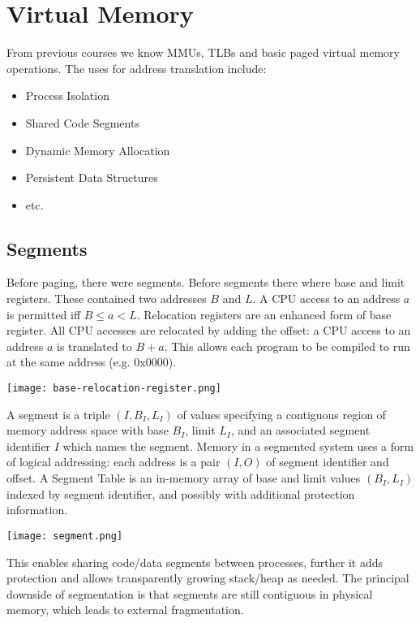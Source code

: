 \section{Virtual Memory}

From previous courses we know MMUs, TLBs and basic paged virtual memory operations. The uses for address translation include:
\begin{itemize}
	\item Process Isolation
	\item Shared Code Segments
	\item Dynamic Memory Allocation
	\item Persistent Data Structures
	\item etc.
\end{itemize}

\subsection{Segments}

Before paging, there were segments. Before segments there where base and limit registers. These contained two addresses $B$ and $L$. A CPU access to an address $a$ is permitted iff $B \leq a < L$. Relocation registers are an enhanced form of base register. All CPU accesses are relocated by adding the offset: a CPU access to an address $a$ is translated to $B + a$. This allows each program to be compiled to run at the same address (e.g. 0x0000). \medskip
\begin{center}
	\texttt{[image: base-relocation-register.png]}
\end{center}

A segment is a triple $(I, B_I, L_I)$ of values specifying a contiguous region of memory address space with base $B_I$, limit $L_I$, and an associated segment identifier $I$ which names the segment. Memory in a segmented system uses a form of logical addressing: each address is a pair $(I, O)$ of segment identifier and offset. A Segment Table is an in-memory array of base and limit values $(B_I, L_I)$ indexed by segment identifier, and possibly with additional protection information.
\begin{center}
	\texttt{[image: segment.png]}
\end{center}

This enables sharing code/data segments between processes, further it adds protection and allows transparently growing stack/heap as needed. The principal downside of segmentation is that segments are still contiguous in physical memory, which leads to external fragmentation.

